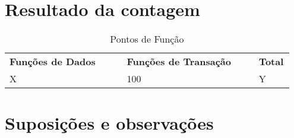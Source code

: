 \vfill
\pagebreak
\section{Resultado da contagem}

\begin{table*}[!h]
\centering
\caption{Pontos de Função}
\label{resultado_contagem}
  \begin{tabular}{|p{0.40\linewidth}|p{0.45\linewidth}|p{0.10\linewidth}|}
  \hline
  \textbf{Funções de Dados} & \textbf{Funções de Transação} & \textbf{Total} \\ 
  X & 100 & Y\\
  \hline
 
  \end{tabular}
\end{table*}

\section{Suposições e observações}

